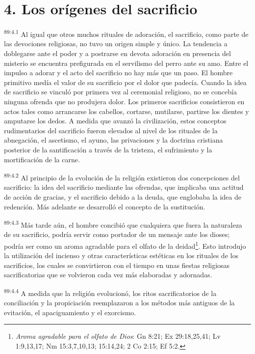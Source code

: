 \section*{4. Los orígenes del sacrificio}
\par
\textsuperscript{89:4.1} Al igual que otros muchos rituales de adoración, el sacrificio, como parte de las devociones religiosas, no tuvo un origen simple y único. La tendencia a doblegarse ante el poder y a postrarse en devota adoración en presencia del misterio se encuentra prefigurada en el servilismo del perro ante su amo. Entre el impulso a adorar y el acto del sacrificio no hay más que un paso. El hombre primitivo medía el valor de su sacrificio por el dolor que padecía. Cuando la idea de sacrificio se vinculó por primera vez al ceremonial religioso, no se concebía ninguna ofrenda que no produjera dolor. Los primeros sacrificios consistieron en actos tales como arrancarse los cabellos, cortarse, mutilarse, partirse los dientes y amputarse los dedos. A medida que avanzó la civilización, estos conceptos rudimentarios del sacrificio fueron elevados al nivel de los rituales de la abnegación, el ascetismo, el ayuno, las privaciones y la doctrina cristiana posterior de la santificación a través de la tristeza, el sufrimiento y la mortificación de la carne.

\par
\textsuperscript{89:4.2} Al principio de la evolución de la religión existieron dos concepciones del sacrificio: la idea del sacrificio mediante las ofrendas, que implicaba una actitud de acción de gracias, y el sacrificio debido a la deuda, que englobaba la idea de redención. Más adelante se desarrolló el concepto de la sustitución.

\par
\textsuperscript{89:4.3} Más tarde aún, el hombre concibió que cualquiera que fuera la naturaleza de su sacrificio, podría servir como portador de un mensaje ante los dioses; podría ser como un aroma agradable para el olfato de la deidad\footnote{\textit{Aroma agradable para el olfato de Dios}: Gn 8:21; Ex 29:18,25,41; Lv 1:9,13,17; Nm 15:3,7,10,13; 15:14,24; 2 Co 2:15; Ef 5:2.}. Esto introdujo la utilización del incienso y otras características estéticas en los rituales de los sacrificios, los cuales se convirtieron con el tiempo en unas fiestas religiosas sacrificatorias que se volvieron cada vez más elaboradas y adornadas.

\par
\textsuperscript{89:4.4} A medida que la religión evolucionó, los ritos sacrificatorios de la conciliación y la propiciación reemplazaron a los métodos más antiguos de la evitación, el apaciguamiento y el exorcismo.

